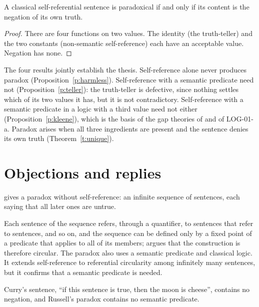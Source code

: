 \documentclass{situationist-preprint}
\begin{document}
\begin{theorem}\label{t:unique}
A classical self-referential sentence is paradoxical if and only if its content is the negation of its own truth.
\end{theorem}

\begin{proof}
There are four functions on two values. The identity (the truth-teller) and the two constants (non-semantic self-reference) each have an acceptable value. Negation has none.
\end{proof}

The four results jointly establish the thesis. Self-reference alone never produces paradox (Proposition~\ref{p:harmless}). Self-reference with a semantic predicate need not (Proposition~\ref{p:teller}): the truth-teller is defective, since nothing settles which of its two values it has, but it is not contradictory. Self-reference with a semantic predicate in a logic with a third value need not either (Proposition~\ref{p:kleene}), which is the basis of the gap theories of \citet{Kripke1975} and of LOG-01-a. Paradox arises when all three ingredients are present and the sentence denies its own truth (Theorem~\ref{t:unique}).

\section{Objections and replies}

\begin{objection}[Yablo]
\citet{Yablo1993} gives a paradox without self-reference: an infinite sequence of sentences, each saying that all later ones are untrue.
\end{objection}

\begin{reply}
Each sentence of the sequence refers, through a quantifier, to sentences that refer to sentences, and so on, and the sequence can be defined only by a fixed point of a predicate that applies to all of its members; \citet{Priest1997} argues that the construction is therefore circular. The paradox also uses a semantic predicate and classical logic. It extends self-reference to referential circularity among infinitely many sentences, but it confirms that a semantic predicate is needed.
\end{reply}

\begin{objection}
Curry's sentence, \enquote{if this sentence is true, then the moon is cheese}, contains no negation, and Russell's paradox contains no semantic predicate.
\end{objection}
\end{document}
